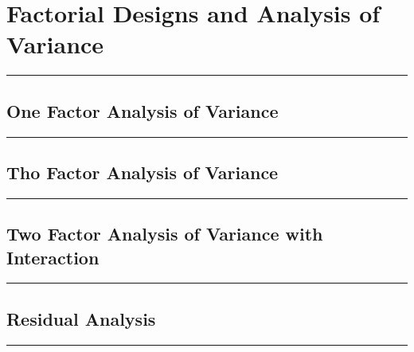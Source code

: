\section{Factorial Designs and Analysis of Variance}
\noindent\rule[\linienAbstand]{\linewidth}{\linienDickeDick}

\subsection{One Factor Analysis of Variance}
\noindent\rule[\linienAbstand]{\linewidth}{\linienDicke}

\subsection{Tho Factor Analysis of Variance}
\noindent\rule[\linienAbstand]{\linewidth}{\linienDicke}

\subsection{Two Factor Analysis of Variance with Interaction}
\noindent\rule[\linienAbstand]{\linewidth}{\linienDicke}

\subsection{Residual Analysis}
\noindent\rule[\linienAbstand]{\linewidth}{\linienDicke}
